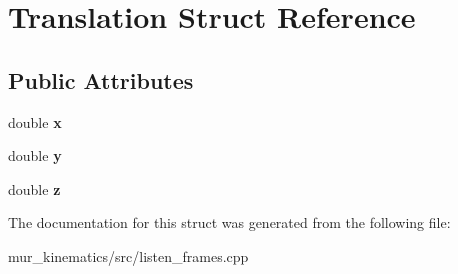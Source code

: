 \hypertarget{structTranslation}{}\section{Translation Struct Reference}
\label{structTranslation}
\subsection*{Public Attributes}
\begin{DoxyCompactItemize}
\item 
\mbox{\label{structTranslation_a7b3aea7b8380a81367a7c289b7a19af7}} 
double {\bfseries x}
\item 
\mbox{\label{structTranslation_a4080bcfcd8dc16dd59d8e126a4cf3763}} 
double {\bfseries y}
\item 
\mbox{\label{structTranslation_ac87bf35effcf1ab42669b2f6b1d0c0db}} 
double {\bfseries z}
\end{DoxyCompactItemize}


The documentation for this struct was generated from the following file\+:\begin{DoxyCompactItemize}
\item 
mur\+\_\+kinematics/src/listen\+\_\+frames.\+cpp\end{DoxyCompactItemize}
